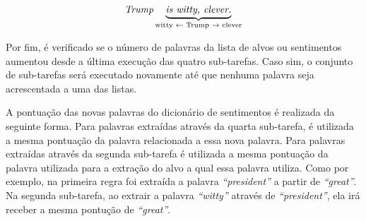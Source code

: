 \[\textit{Trump} \underbrace{\textit{is witty, clever.}}_\text{witty
\textleftarrow \text{ Trump} \textrightarrow \text{ clever}}\]

Por fim, é verificado se o número de palavras da lista de alvos ou sentimentos
aumentou desde a última execução das quatro sub-tarefas. Caso sim, o conjunto de
sub-tarefas será executado novamente até que nenhuma palavra seja acrescentada a
uma das listas.

A pontuação das novas palavras do dicionário de sentimentos é realizada da
seguinte forma. Para palavras extraídas através da quarta sub-tarefa, é
utilizada a mesma pontuação da palavra relacionada a essa nova palavra. Para
palavras extraídas através da segunda sub-tarefa é utilizada a mesma pontuação
da palavra utilizada para a extração do alvo a qual essa palavra utiliza. Como
por exemplo, na primeira regra foi extraída a palavra \textit{``president''} a
partir de \textit{``great''}. Na segunda sub-tarefa, ao extrair a palavra
\textit{``witty''} através de \textit{``president''}, ela irá receber a mesma
pontução de \textit{``great''}.



